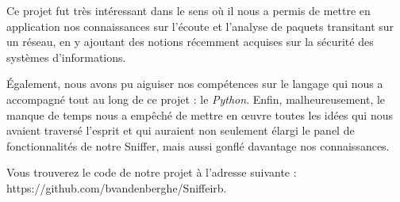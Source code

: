 Ce projet fut très intéressant dans le sens où il nous a permis de mettre en application nos connaissances sur l'écoute et l'analyse de paquets transitant sur un réseau, en y ajoutant des notions récemment acquises sur la sécurité des systèmes d'informations. 

Également, nous avons pu aiguiser nos compétences sur le langage qui nous a accompagné tout au long de ce projet : le \emph{Python}. Enfin, malheureusement, le manque de temps nous a empêché de mettre en \oe uvre toutes les idées qui nous avaient traversé l'esprit et qui auraient non seulement élargi le panel de fonctionnalités de notre Sniffer, mais aussi gonflé davantage nos connaissances.

Vous trouverez le code de notre projet à l'adresse suivante : https://github.com/bvandenberghe/Sniffeirb.
